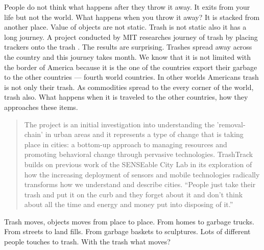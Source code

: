 People do not think what happens after they throw it away. It exits from your life but not the world. What happens when you throw it away? It is stacked from another place. Value of objects are not static. Trash is not static  also it has a long journey. A project conducted by MIT researches journey of trash by placing trackers onto the trash \cite{chen2009mit}. The results are surprising. Trashes spread away across the country and this journey takes month.  We know that it is not limited with the border of America because it is the one of the countries export their garbage to the other countries --- fourth world countries. In other worlds Americans trash is not only their trash. As commodities spread to the every corner of the world, trash also. What happens when it is traveled to the other countries, how they approaches these items.  

\begin{quote}
 The project is an initial investigation into understanding the 'removal-chain' in urban areas and it represents a type of change that is taking place in cities: a bottom-up approach to managing resources and promoting behavioral change through pervasive technologies. TrashTrack builds on previous work of the SENSEable City Lab in its exploration of how the increasing deployment of sensors and mobile technologies radically transforms how we understand and describe cities. “People just take their trash and put it on the curb and they forget about it and don’t think about all the time and energy and money put into disposing of it.”
\end{quote}

Trash moves, objects moves from place to place. From homes to garbage trucks. From streets to land fills. From garbage baskets to sculptures.  Lots of different people touches to trash. With the trash what moves?

